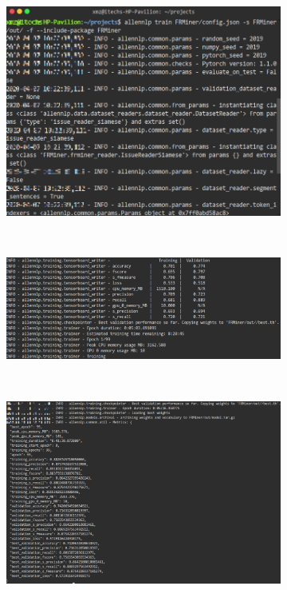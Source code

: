 \begin{figure}[htb]
    \centering
    \begin{subfigure}[b]{0.3\textwidth}
      \includegraphics[width=\textwidth]{Img/start.png}
      \caption{}
      \label{fig:start}
    \end{subfigure}%
    ~%
    \begin{subfigure}[b]{0.3\textwidth}
      \includegraphics[width=\textwidth]{Img/train.png}
      \caption{}
      \label{fig:train}
    \end{subfigure}
    ~%
    \begin{subfigure}[b]{0.3\textwidth}
      \includegraphics[width=\textwidth]{Img/result.png}
      \caption{}
      \label{fig:result}
    \end{subfigure}%
    ~%


\end{figure}
